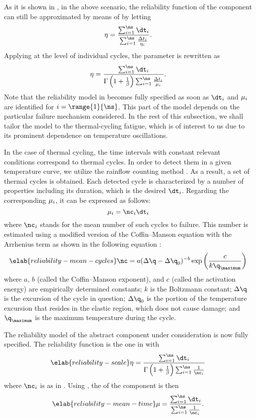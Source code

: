 As it is shown in \cite{xiang2010}, in the above scenario, the reliability
function of the component can still be approximated by means of
 by letting
\[
  \scale = \frac{\sum_{i = 1}^\ns \dt_i}{\sum_{i = 1}^\ns \frac{\Delta t_i}{\scale_i}}.
\]
Applying  at the level of individual cycles, the
parameter is rewritten as
\[
  \scale = \frac{\sum_{i = 1}^\ns \dt_i}{\Gamma\left(1 + \frac{1}{\shape}\right) \sum_{i = 1}^\ns \frac{\Delta t_i}{\mean_i}}.
\]
Note that the reliability model in  becomes fully
specified as soon as $\dt_i$ and $\mu_i$ are identified for $i =
\range{1}{\ns}$. This part of the model depends on the particular failure
mechanism considered. In the rest of this subsection, we shall tailor the model
to the thermal-cycling fatigue, which is of interest to us due to its prominent
dependence on temperature oscillations.

In the case of thermal cycling, the time intervals with constant relevant
conditions correspond to thermal cycles. In order to detect them in a given
temperature curve, we utilize the rainflow counting method \cite{xiang2010}. As
a result, a set of \ns thermal cycles is obtained. Each detected cycle is
characterized by a number of properties including its duration, which is the
desired $\dt_i$. Regarding the corresponding $\mu_i$, it can be expressed as
follows:
\[
  \mean_i = \nc_i \dt_i
\]
where $\nc_i$ stands for the mean number of such cycles to failure. This number
is estimated using a modified version of the Coffin--Manson equation with the
Arrhenius term as shown in the following equation \cite{xiang2010, jedec2010}:
\begin{equation} \elab{reliability-mean-cycles}
  \nc = a (\Delta \q - \Delta \q_0)^{-b} \exp\left(\frac{c}{k \q_\maximum}\right)
\end{equation}
where $a$, $b$ (called the Coffin--Manson exponent), and $c$ (called the
activation energy) are empirically determined constants; $k$ is the Boltzmann
constant; $\Delta \q$ is the excursion of the cycle in question; $\Delta \q_0$
is the portion of the temperature excursion that resides in the elastic region,
which does not cause damage; and $\q_\maximum$ is the maximum temperature during
the cycle.

The reliability model of the abstract component under consideration is now fully
specified. The reliability function is the one in 
with
\begin{equation} \elab{reliability-scale}
  \scale = \frac{\sum_{i = 1}^\ns \dt_i}{\Gamma\left(1 + \frac{1}{\shape}\right) \sum_{i = 1}^\ns \frac{1}{\nc_i}}
\end{equation}
where $\nc_i$ is as in . Using
, the  of the
component is then
\begin{equation} \elab{reliability-mean-time}
  \mean = \frac{\sum_{i = 1}^\ns \dt_i}{\sum_{i = 1}^\ns \frac{1}{\nc_i}}.
\end{equation}

